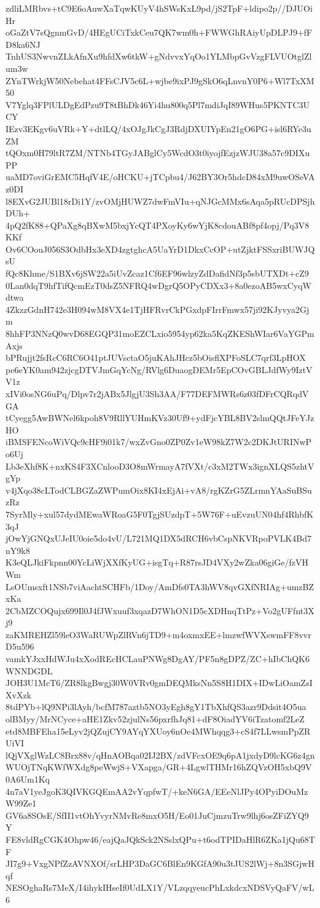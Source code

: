 zdliLMRbvs+tC9E6oAuwXaTqwKUyV4hSWsKxL9pd/jS2TpF+ldipo2p//DJUOiHr
oGaZtV7sQgnmGvD/4HEgUCiTxkCeu7QK7wm0h+FWWGhRAiyUpDLPJ9+fFD8ka6NJ
TnhUS3NwvnZLkAfnXu9hfdXw6tkW+gNdvvxYqOo1YLMbpGvVzgFLVUOtglZlum3w
ZYnTWrkjW50Nebehat4FFsCJV5c6L+wjbe9ixPJ9gSkO6qLnvnY0P6+Wl7TxXM50
V7Yglq3FPlULDgEdPzu9T8tBhDk46Yi4hu800q5Pl7mdiJqI89WHus5PKNTC3UCY
IEzv3EKgv6uVRk+Y+dtlLQ/4xOJgJkCgJ3RdjDXUIYpEn21gO6PG+isl6RYe3uZM
tQOxm0H79ltR7ZM/NTNb4TGyJABglCy5WcdO3t0iyojfEzjzWJU38a57c9DIXuPP
uaMD7oviGrEMC5HqfV4E/oHCKU+jTCpbu4/J62BY3Or5hdcD84xM9uwOSeVAz0DI
l8EXvG2JUBl18rDi1Y/zvOMjHUWZ7dwFmVIu+qNJGcMMx6sAqa5pRUcDPSjhDUh+
4pQ2fK88+QPaXg8qBXwM5bxjYcQT4PXoyKy6wYjK8cdouABf8pf4opj/Pq3V8KKf
Ov6COouJ056S3OdbHx3eXD4zgtghcA5UaYrD1DkxCcOP+utZjktFSSxriBUWJQsU
fQc8Khme/S1BXv6jSW22a5iUvZcaz1Cf6EF96wlzyZdDafidNf3p5sbUTXDt+cZ9
0Lan0dqT9hfTifQcmEzT0dsZ5NFRQ4wDgrQ5OPyCDXx3+8a0ezoAB5wxCyqWdtwa
4ZkzzGdnH742e3H094wM8VX4e1TjHFRvrCkPGxdpFIrrFmwx57ji92KJyvya2Gjm
8hhFP3NNzQ0wvD68EGQP31moEZCLxio5954yp62ka5KqZKEShWIar6VaYGPmAxjs
bPRujjt2fsRcC6RC6O41ptJUVsctaO5juKAhJHcz5bOisflXPFoSLC7qrf3LpHOX
pe6eYK0am942zjcgDTVJmGqYcNg/RVlg6DuaogDEMr5EpCOvGBLJdfWy9IztVV1z
xIVi0osNG6uPq/Dlpv7r2jABx5JlgjU3Sh3AA/F77DEFMWRs6z03fDFrCQRqdVGA
tCyegg5AwBWNel6kpoh8V9RllYUHmKVz30Uf9+ydFjcYBL8BV2slmQQtJFeYJzHO
iBMSFENcoWiVQc9cHF9i01k7/wxZvGno0ZP0Zv1eW98kZ7W2c2DKJtURINwPo6Uj
Lb3eXhf8K+nxKS4F3XCnlooD3O8mWrmayA7fVXt/c3xM2TWx3ignXLQS5zhtVgYp
v4jXqo38cLTodCLBGZaZWPumOix8KI4xEjAi+vA8/rgKZrG5ZLrmnYAaSuBSuzRz
7SyrMly+xul57dydMEwaWRoaG5F0TgjSUzdpT+5W76F+uEvzuUN04hf4RhbfK3qJ
jOwYjGNQxUJeIU0oie5do4vU/L721MQ1DX5dRCH6vbCspNKVRpoPVLK4Bd7nY9k8
K3eQLJkiFkpnn00YcLiWjXXfKyUG+isgTq+R87rsJD4VXy2wZka06giGe/fzVHWm
LsOUmsxft1NSb7viAachtSCHFb/1Doy/AmDfs0TA3hWV8qvGXfNRIAg+umzBZxKa
2CbMZCOQujx699Il0J4fJWxuuf3xqazD7WhON1D5cXDHnqTtPz+Vo2gUFfnt3Xj9
zaKMREHZl59leO3WaRUWpZlRVn6jTD9+m4oxmxEE+lmzwfWVXswmFF8vvrD5u596
vamkYJxxHdWJu4xXodREcHCLauPNWg8DgAY/PF5n8gDPZ/ZC+hIbChQK6WNNDGDL
JOH3U1McT6/ZR8lkgBwgj30W0VRv0gmDEQMksNn5S8H1DIX+IDwLiOamZsIXvXzk
8tdPYb+lQ9NPi3lAyh/bcfM787aztb5NO3yEgh8gY1TbXhfQS3azr9Ddsit4O5ua
olBMyy/MrNCyce+aHE1Zkv52zjulNs56pxrfhJq81+dF8OiadYV6iTzatomf2LeZ
etd8MBFEha15eLyv2jQZujCY9AYqYXUoy6nOe4MWhqqg3+cS4f7LLwsmPpZRUiVI
lQjVXglWzLC8Brx88v/qHnAOBqa02IJ2BX/zdVFcxOE9q6pA1jxdyD9lcKG6z4gn
WUOjTNqKWfWXdg8peWwjS+VXapga/GR+4LgwlTHMr16hZQVzOH5xbQ9V0A6Um1Kq
4n7aV1yeJgoK3QIVKGQEmAA2vYqpfwT/+keN6GA/EEeNlJPy4OPyiDOuMzW99Ze1
GV6a8SOsE/SfII1vtOhYvyrNMvRe8mxO5H/Eo01JuCjmzuTrw9lhj6osZFiZYQ9Y
FE8vldRgCGK4Ohpw46/eajQaJQkSck2NSslxQPu+t6odTPIDaHlR6ZKa1jQu68TF
JI7g9+VxgNPfZzAVNXOf/srLHP3DaGC6BlEn9KGfA90u3tJUS2lWj+8n3SGjwHqf
NESOghaRs7MeX/I4ihykIHseIf0UdLX1Y/VLzqqyeucPhLxkdcxNDSVyQaFV/wL6
